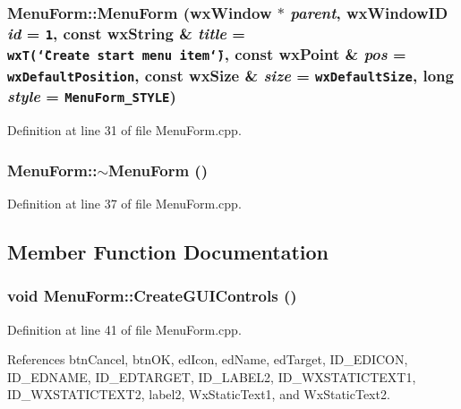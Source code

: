 \subsubsection{\setlength{\rightskip}{0pt plus 5cm}Menu\-Form::Menu\-Form (wx\-Window $\ast$ {\em parent}, wx\-Window\-ID {\em id} = {\tt 1}, const wx\-String \& {\em title} = {\tt wxT(\char`\"{}Create~start~menu~item\char`\"{})}, const wx\-Point \& {\em pos} = {\tt wxDefaultPosition}, const wx\-Size \& {\em size} = {\tt wxDefaultSize}, long {\em style} = {\tt MenuForm\_\-STYLE})}\label{class_menu_form_139dcf17c43a76eb7bb91cddd7ce1651}




Definition at line 31 of file Menu\-Form.cpp.
\subsubsection{\setlength{\rightskip}{0pt plus 5cm}Menu\-Form::$\sim$Menu\-Form ()\hspace{0.3cm}{\tt  [virtual]}}\label{class_menu_form_b20e7f52b30cb65140d1b7a6a80a89e6}




Definition at line 37 of file Menu\-Form.cpp.

\subsection{Member Function Documentation}
\subsubsection{\setlength{\rightskip}{0pt plus 5cm}void Menu\-Form::Create\-GUIControls ()\hspace{0.3cm}{\tt  [private]}}\label{class_menu_form_eb8d36320a6c66f3b4ce972858588688}




Definition at line 41 of file Menu\-Form.cpp.

References btn\-Cancel, btn\-OK, ed\-Icon, ed\-Name, ed\-Target, ID\_\-EDICON, ID\_\-EDNAME, ID\_\-EDTARGET, ID\_\-LABEL2, ID\_\-WXSTATICTEXT1, ID\_\-WXSTATICTEXT2, label2, Wx\-Static\-Text1, and Wx\-Static\-Text2.
